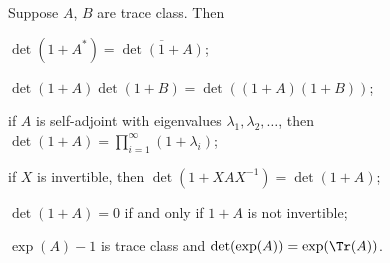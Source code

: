 \documentclass[12pt]{amsart}
\begin{document}
\begin{thm}
Suppose $A$, $B$ are trace class. Then
\begin{romanumerate}
\item $\det(1+A^\ast) = \overline{\det(1+A)}$;
\item $\det(1+A)\det(1+B) = \det((1+A)(1+B))$;
\item if $A$ is self-adjoint with eigenvalues $\lambda_1, \lambda_2, \ldots$, then $\det(1+A) = \prod_{i=1}^{\infty} (1+\lambda_i)$;
\item if $X$ is invertible, then $\det(1+XAX^{-1}) = \det(1+A)$;
\item $\det(1+A) = 0$ if and only if $1+A$ is not invertible;
\item $\exp(A)-1$ is trace class and
$\det(\exp(A)) = \exp(\Tr(A))$.
\end{romanumerate}
\end{thm}
\end{document}
